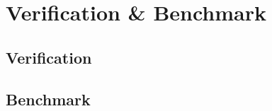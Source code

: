 %
%
\chapter{Verification \& Benchmark} \label{chapt:ver_bench}

\section{Verification} \label{ch:verification}

\section{Benchmark} \label{ch:benchmark}
